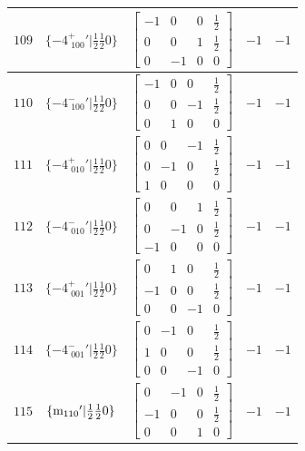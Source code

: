 \documentclass[fleqn,8pt]{jsarticle}
\begin{document}
\begin{longtable}{ccccc}
$ 109 $ & $ \{-4^{+}_{\,\,100}{}'|\frac{1}{2} \frac{1}{2} 0\} $ & $ \begin{bmatrix} -1 & 0 & 0 & \frac{1}{2} \\ 0 & 0 & 1 & \frac{1}{2} \\ 0 & -1 & 0 & 0 \end{bmatrix} $ & $ -1 $ & $ -1 $ \\ \hline
$ 110 $ & $ \{-4^{-}_{\,\,100}{}'|\frac{1}{2} \frac{1}{2} 0\} $ & $ \begin{bmatrix} -1 & 0 & 0 & \frac{1}{2} \\ 0 & 0 & -1 & \frac{1}{2} \\ 0 & 1 & 0 & 0 \end{bmatrix} $ & $ -1 $ & $ -1 $ \\ \hline
$ 111 $ & $ \{-4^{+}_{\,\,010}{}'|\frac{1}{2} \frac{1}{2} 0\} $ & $ \begin{bmatrix} 0 & 0 & -1 & \frac{1}{2} \\ 0 & -1 & 0 & \frac{1}{2} \\ 1 & 0 & 0 & 0 \end{bmatrix} $ & $ -1 $ & $ -1 $ \\ \hline
$ 112 $ & $ \{-4^{-}_{\,\,010}{}'|\frac{1}{2} \frac{1}{2} 0\} $ & $ \begin{bmatrix} 0 & 0 & 1 & \frac{1}{2} \\ 0 & -1 & 0 & \frac{1}{2} \\ -1 & 0 & 0 & 0 \end{bmatrix} $ & $ -1 $ & $ -1 $ \\ \hline
$ 113 $ & $ \{-4^{+}_{\,\,001}{}'|\frac{1}{2} \frac{1}{2} 0\} $ & $ \begin{bmatrix} 0 & 1 & 0 & \frac{1}{2} \\ -1 & 0 & 0 & \frac{1}{2} \\ 0 & 0 & -1 & 0 \end{bmatrix} $ & $ -1 $ & $ -1 $ \\ \hline
$ 114 $ & $ \{-4^{-}_{\,\,001}{}'|\frac{1}{2} \frac{1}{2} 0\} $ & $ \begin{bmatrix} 0 & -1 & 0 & \frac{1}{2} \\ 1 & 0 & 0 & \frac{1}{2} \\ 0 & 0 & -1 & 0 \end{bmatrix} $ & $ -1 $ & $ -1 $ \\ \hline
$ 115 $ & $ \{{\rm m}_{110}{}'|\frac{1}{2} \frac{1}{2} 0\} $ & $ \begin{bmatrix} 0 & -1 & 0 & \frac{1}{2} \\ -1 & 0 & 0 & \frac{1}{2} \\ 0 & 0 & 1 & 0 \end{bmatrix} $ & $ -1 $ & $ -1 $ \\ \hline

\end{longtable}
\end{document}
